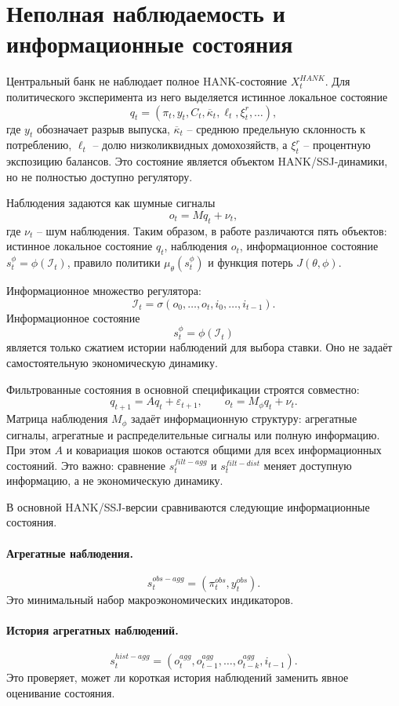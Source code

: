 \section{Неполная наблюдаемость и информационные состояния}

Центральный банк не наблюдает полное HANK-состояние \(X_t^{HANK}\). Для политического
эксперимента из него выделяется истинное локальное состояние
\[
q_t
=
\left(
\pi_t,
y_t,
C_t,
\overline{\kappa}_t,
\ell_t,
\xi_t^r,
\ldots
\right),
\]
где \(y_t\) обозначает разрыв выпуска, \(\overline{\kappa}_t\) -- среднюю предельную
склонность к потреблению, \(\ell_t\) -- долю низколиквидных домохозяйств, а \(\xi_t^r\) --
процентную экспозицию балансов. Это состояние является объектом HANK/SSJ-динамики, но не
полностью доступно регулятору.

Наблюдения задаются как шумные сигналы
\[
o_t=Mq_t+\nu_t,
\]
где \(\nu_t\) -- шум наблюдения. Таким образом, в работе различаются пять объектов: истинное
локальное состояние \(q_t\), наблюдения \(o_t\), информационное состояние
\(s_t^\phi=\phi(\mathcal I_t)\), правило политики \(\mu_\theta(s_t^\phi)\) и функция потерь
\(J(\theta,\phi)\).

Информационное множество регулятора:
\[
\mathcal I_t
=
\sigma(o_0,\ldots,o_t,i_0,\ldots,i_{t-1}).
\]
Информационное состояние
\[
s_t^\phi=\phi(\mathcal I_t)
\]
является только сжатием истории наблюдений для выбора ставки. Оно не задаёт самостоятельную экономическую динамику.

Фильтрованные состояния в основной спецификации строятся совместно:
\[
q_{t+1}=Aq_t+\varepsilon_{t+1},
\qquad
o_t=M_\phi q_t+\nu_t.
\]
Матрица наблюдения \(M_\phi\) задаёт информационную структуру: агрегатные сигналы,
агрегатные и распределительные сигналы или полную информацию. При этом \(A\) и ковариация
шоков остаются общими для всех информационных состояний. Это важно: сравнение
\(s_t^{filt-agg}\) и \(s_t^{filt-dist}\) меняет доступную информацию, а не экономическую
динамику.

В основной HANK/SSJ-версии сравниваются следующие информационные состояния.

\paragraph{Агрегатные наблюдения.}
\[
s_t^{obs-agg}
=
\left(
\pi_t^{obs},
y_t^{obs}
\right).
\]
Это минимальный набор макроэкономических индикаторов.

\paragraph{История агрегатных наблюдений.}
\[
s_t^{hist-agg}
=
\left(
o_t^{agg},
o_{t-1}^{agg},
\ldots,
o_{t-k}^{agg},
i_{t-1}
\right).
\]
Это проверяет, может ли короткая история наблюдений заменить явное оценивание состояния.

